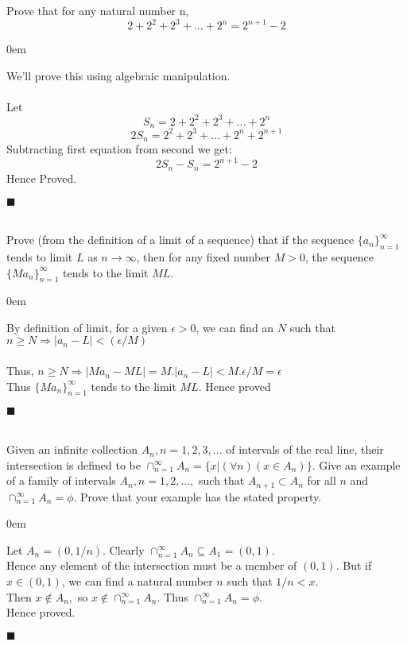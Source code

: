 \documentclass[12pt]{article}
\renewcommand{\qed}{\hfill$\blacksquare$}
\renewenvironment{proof}{\begin{addmargin}[1em]{0em}\begin{newproof}}{\end{newproof}\end{addmargin}\qed}
\newenvironment{problem}[2][Problem]{\begin{trivlist}
\item[\hskip \labelsep {\bfseries #1}\hskip \labelsep {\bfseries #2.}]}{\end{trivlist}}
\begin{document}
 \begin{problem}{7} Prove that for any natural number n,
 $$2 + 2^2 + 2^3 + ... + 2^n = 2^{n+1} - 2$$
\end{problem}

\begin{proof}
We'll prove this using algebraic manipulation.\\ \\
Let $$S_n = 2 + 2^2 + 2^3 + ... + 2^n$$
$$2S_n = 2^2 + 2^3 + ... + 2^n + 2^{n+1}$$
Subtracting first equation from second we get: 
$$2S_n - S_n = 2^{n+1} - 2$$
Hence Proved.
\end{proof}
 \\
 \\
 
 
\begin{problem}{8} Prove (from the definition of a limit of a sequence) that if the sequence $\{a_n\}_{n=1}^{\infty}$ tends to limit $L$
as $n \to \infty$, then for any fixed number $M > 0$, the sequence $\{M a_n\}_
{n=1}^{\infty}$ tends to the limit $ML$.
\end{problem}

\begin{proof}
By definition of limit, for a given $\epsilon > 0$, we can find an $N$ such that $n \geq N \Rightarrow |a_n - L| < (\epsilon/M)$\\ \\
Thus, $n \geq N \Rightarrow |Ma_n - ML| = M.|a_n - L| < M.\epsilon/M = \epsilon$ \\
Thus $\{M a_n\}_
{n=1}^{\infty}$ tends to the limit $ML$. Hence proved
\end{proof}
 \\
 \\
 

\begin{problem}{9} Given an infinite collection $A_n, n = 1, 2, 3,...$ of intervals of the real line, their intersection is defined to be $\cap_{n=1}^{\infty} A_n = \{ x|(\forall n)(x \in A_n)\}$. Give an example of a family of intervals $A_n, n=1,2,...,$ such that $A_{n+1} \subset A_n$ for all $n$ and $\cap_{n=1}^{\infty} A_n = \phi$. Prove that your example has the stated property.
\end{problem}

\begin{proof}
Let $A_n = (0, 1/n)$. Clearly $\cap_{n=1}^{\infty} A_n \subseteq A_1 = (0,1)$. \\
Hence any element of the intersection must be a member of $(0,1)$. But if $x \in (0,1)$, we can find a natural number $n$ such that $1/n < x$. \\
Then $x \notin A_n,$ so $x \notin \cap_{n=1}^{\infty} A_n$. Thus $\cap_{n=1}^{\infty} A_n = \phi$. \\
Hence proved.
\end{proof}
 \\
 \\
 
\end{document}
